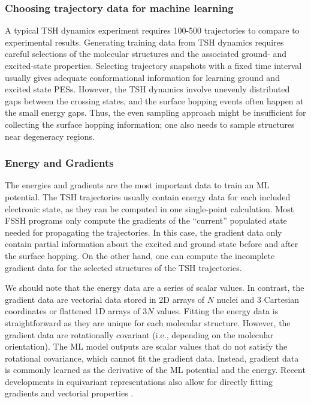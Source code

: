 \documentclass[9pt,bestpractices]{livecoms}
\begin{document}
\subsubsection{Choosing trajectory data for machine learning}
\label{sec:trajdatachoice}

A typical TSH dynamics experiment requires 100-500 trajectories to compare to experimental results. Generating training data from TSH dynamics requires careful selections of the molecular structures and the associated ground- and excited-state properties. Selecting trajectory snapshots with a fixed time interval usually gives adequate conformational information for learning ground and excited state PESs. However, the TSH dynamics involve unevenly distributed gaps between the crossing states, and the surface hopping events often happen at the small energy gaps. Thus, the even sampling approach might be insufficient for collecting the surface hopping information; one also needs to sample structures near degeneracy regions.

\subsubsection{Energy and Gradients}
\label{sec:energyandgradients}

The energies and gradients are the most important data to train an ML potential. The TSH trajectories usually contain energy data for each included electronic state, as they can be computed in one single-point calculation. Most FSSH programs only compute the gradients of the “current” populated state needed for propagating the trajectories. In this case, the gradient data only contain partial information about the excited and ground state before and after the surface hopping. On the other hand, one can compute the incomplete gradient data for the selected structures of the TSH trajectories.

We should note that the energy data are a series of scalar values. In contrast, the gradient data are vectorial data stored in 2D arrays of $N$ nuclei and 3 Cartesian coordinates or flattened 1D arrays of $3N$ values. Fitting the energy data is straightforward as they are unique for each molecular structure. However, the gradient data are rotationally covariant (i.e., depending on the molecular orientation). The ML model outputs are scalar values that do not satisfy the rotational covariance, which cannot fit the gradient data. Instead, gradient data is commonly learned as the derivative of the ML potential and the energy. Recent developments in equivariant representations also allow for directly fitting gradients and vectorial properties \cite{RN127, RN95, Schutt21}.
\end{document}

